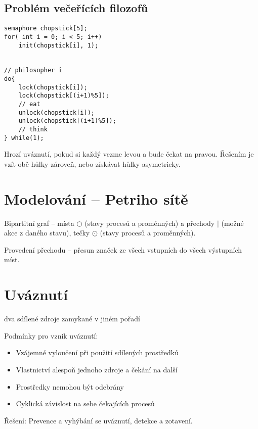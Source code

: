 \documentclass[a4wide]{report}
\begin{document}
\subsection{Problém večeřících filozofů}

\begin{lstlisting}
semaphore chopstick[5];
for( int i = 0; i < 5; i++)
	init(chopstick[i], 1);


// philosopher i
do{
	lock(chopstick[i]);
	lock(chopstick[(i+1)%5]);
	// eat
	unlock(chopstick[i]);
	unlock(chopstick[(i+1)%5]);
	// think
} while(1);

\end{lstlisting}

Hrozí uváznutí, pokud si každý vezme levou a bude čekat na pravou. Řešením je vzít obě hůlky zároveň, nebo získávat hůlky asymetricky.

\section{Modelování -- Petriho sítě}

Bipartitní graf -- místa $\bigcirc$ (stavy procesů a proměnných) a přechody $\mid$ (možné akce z daného stavu), tečky $\odot$ (stavy procesů a proměnných).

Provedení přechodu -- přesun značek ze všech vstupních do všech výstupních míst.

\section{Uváznutí}
dva sdílené zdroje zamykané v jiném pořadí

Podmínky pro vznik uváznutí:
\begin{itemize}
	\item Vzájemné vyloučení při použití sdílených prostředků
	\item Vlastnictví alespoň jednoho zdroje a čekání na další
	\item Prostředky nemohou být odebrány
	\item Cyklická závislost na sebe čekajících procesů
\end{itemize}

Řešení: Prevence a vyhýbání se uváznutí, detekce a zotavení.
\end{document}
